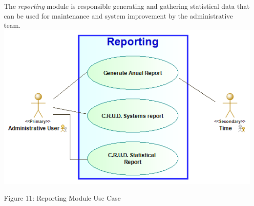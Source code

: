 The \textit{reporting} module is responsible generating and gathering statistical data that can be used for maintenance and system improvement by the administrative team.\\

\includegraphics[width=\textwidth]{images/Reporting_Use_Case_Diagram.png}
\begin{center}
	Figure 11: Reporting Module Use Case
\end{center}